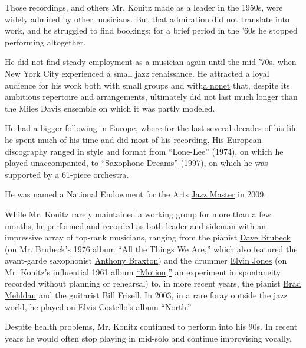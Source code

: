 Those recordings, and others Mr. Konitz made as a leader in the 1950s,
were widely admired by other musicians. But that admiration did not
translate into work, and he struggled to find bookings; for a brief
period in the '60s he stopped performing altogether.

He did not find steady employment as a musician again until the
mid-'70s, when New York City experienced a small jazz renaissance. He
attracted a loyal audience for his work both with small groups and
with\href{https://www.youtube.com/watch?v=ge6RoRO-3sU}{a nonet} that,
despite its ambitious repertoire and arrangements, ultimately did not
last much longer than the Miles Davis ensemble on which it was partly
modeled.

He had a bigger following in Europe, where for the last several decades
of his life he spent much of his time and did most of his recording. His
European discography ranged in style and format from ``Lone-Lee''
(1974), on which he played unaccompanied, to
\href{https://www.youtube.com/watch?v=eYVqhj7xnIg}{``Saxophone Dreams''}
(1997), on which he was supported by a 61-piece orchestra.

He was named a National Endowment for the Arts
\href{https://www.arts.gov/honors/jazz/lee-konitz}{Jazz Master} in 2009.

While Mr. Konitz rarely maintained a working group for more than a few
months, he performed and recorded as both leader and sideman with an
impressive array of top-rank musicians, ranging from the pianist
\href{https://www.nytimes3xbfgragh.onion/2012/12/06/arts/music/dave-brubeck-jazz-musician-dies-at-91.html}{Dave
Brubeck} (on Mr. Brubeck's 1976 album
\href{https://www.youtube.com/watch?v=2kwAoh8jl0U}{``All the Things We
Are,''} which also featured the avant-garde saxophonist
\href{https://www.nytimes3xbfgragh.onion/2019/01/11/arts/anthony-braxton-composer.html}{Anthony
Braxton}) and the drummer
\href{https://www.nytimes3xbfgragh.onion/2004/05/19/arts/elvin-jones-jazz-drummer-with-coltrane-dies-at-76.html}{Elvin
Jones} (on Mr. Konitz's influential 1961 album
\href{https://www.youtube.com/watch?v=IpNhX-UvIxM}{``Motion,''} an
experiment in spontaneity recorded without planning or rehearsal) to, in
more recent years, the pianist
\href{https://www.youtube.com/watch?v=jAKwaZOWX8c}{Brad Mehldau} and the
guitarist Bill Frisell. In 2003, in a rare foray outside the jazz world,
he played on Elvis Costello's album ``North.''

Despite health problems, Mr. Konitz continued to perform into his 90s.
In recent years he would often stop playing in mid-solo and continue
improvising vocally.

